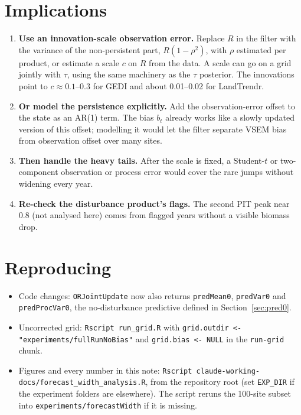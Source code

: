 \documentclass[11pt]{article}
\newcommand{\code}[1]{\texttt{#1}}
\begin{document}
\section{Implications}

\begin{enumerate}
  \item \textbf{Use an innovation-scale observation error.} Replace $R$ in the filter with the variance of the
  non-persistent part, $R(1-\rho^2)$, with $\rho$ estimated per product, or estimate
  a scale $c$ on $R$ from the data. A scale can go on a grid jointly with $\tau$, using the same
  machinery as the $\tau$ posterior. The innovations point to $c \approx 0.1$--$0.3$ for GEDI and
  about 0.01--0.02 for LandTrendr.
  \item \textbf{Or model the persistence explicitly.} Add the observation-error offset to the state as an AR(1)
  term. The bias $b_t$ already works like a slowly updated version of this offset;
  modelling it would let the filter separate VSEM bias from observation offset over many
  sites.
  \item \textbf{Then handle the heavy tails.} After the scale is fixed, a Student-$t$ or two-component
  observation or process error would cover the rare jumps without widening every year.
  \item \textbf{Re-check the disturbance product's flags.} The second PIT peak near 0.8 (not analysed here)
  comes from flagged years without a visible biomass drop.
\end{enumerate}

\section{Reproducing}

\begin{itemize}
  \item Code changes: \code{ORJointUpdate} now also returns \code{predMean0}, \code{predVar0}
  and \code{predProcVar0}, the no-disturbance predictive defined in Section~\ref{sec:pred0}.
  \item Uncorrected grid: \code{Rscript run\_grid.R} with \code{grid.outdir <- "experiments/fullRunNoBias"}
  and \code{grid.bias <- NULL} in the \code{run-grid} chunk.
  \item Figures and every number in this note:
  \code{Rscript claude-working-docs/forecast\_width\_analysis.R}, from the repository root
  (set \code{EXP\_DIR} if the experiment folders are elsewhere). The script reruns the
  100-site subset into \code{experiments/forecastWidth} if it is missing.
\end{itemize}
\end{document}
